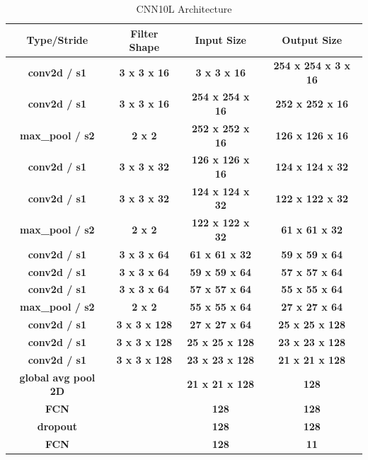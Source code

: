     \begin{table}[h]
    \centering
    \begin{tabular}{cccc}
        \toprule
        \textbf{Type/Stride} & \textbf{Filter Shape} & \textbf{Input Size} & \textbf{Output Size}\\
        \hline
        \textbf{conv2d / s1} & \textbf{3 x 3 x 16}  & \textbf{3 x 3 x 16} & \textbf{254 x 254 x 3 x 16}\\
        \hline
        \textbf{conv2d / s1} & \textbf{3 x 3 x 16}  & \textbf{254 x 254 x 16} & \textbf{252 x 252 x 16}\\
        \hline
        \textbf{max\_pool / s2} & \textbf{2 x 2}  & \textbf{252 x 252 x 16} & \textbf{126 x 126 x 16}\\
        \hline
        \textbf{conv2d / s1} &\textbf{3 x 3 x 32}  & \textbf{126 x 126 x 16} & \textbf{124 x 124 x 32}\\
        \hline
        \textbf{conv2d / s1} &\textbf{3 x 3 x 32}  & \textbf{124 x 124 x 32} & \textbf{122 x 122 x 32}\\
        \hline
        \textbf{max\_pool / s2} & \textbf{2 x 2}  & \textbf{122 x 122 x 32} & \textbf{61 x 61 x 32}\\
        \hline
        \textbf{conv2d / s1} & \textbf{3 x 3 x 64}  & \textbf{61 x 61 x 32} & \textbf{59 x 59 x 64}\\
        \hline
        \textbf{conv2d / s1} & \textbf{3 x 3 x 64}  & \textbf{59 x 59 x 64} & \textbf{57 x 57 x 64}\\
        \hline
        \textbf{conv2d / s1} & \textbf{3 x 3 x 64} & \textbf{57 x 57 x 64} & \textbf{55 x 55 x 64}\\
        \hline
        \textbf{max\_pool / s2} & \textbf{2 x 2} & \textbf{55 x 55 x 64} & \textbf{27 x 27 x 64}\\
        \hline
        \textbf{conv2d / s1} & \textbf{3 x 3 x 128} & \textbf{27 x 27 x 64} & \textbf{25 x 25 x 128}\\
        \hline
        \textbf{conv2d / s1} & \textbf{3 x 3 x 128} & \textbf{25 x 25 x 128} & \textbf{23 x 23 x 128}\\
        \hline
        \textbf{conv2d / s1} & \textbf{3 x 3 x 128} & \textbf{23 x 23 x 128} & \textbf{21 x 21 x 128}\\
        \hline
        \textbf{global avg pool 2D} & & \textbf{21 x 21 x 128} & \textbf{128}\\
        \hline
        \textbf{FCN} & & \textbf{128} & \textbf{128}\\
        \hline
        \textbf{dropout} & & \textbf{128} & \textbf{128}\\
        \hline
        \textbf{FCN} & & \textbf{128} & \textbf{11}\\

        \bottomrule


    \end{tabular}
    \caption{CNN10L Architecture}
    \label{tab:cnn10L-arch}
\end{table}
    
